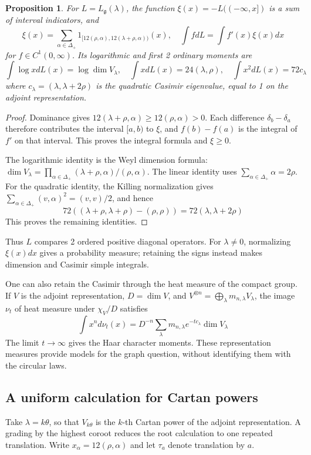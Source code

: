 \documentclass[11pt,reqno]{amsart}
\newtheorem{prop}[thm]{Proposition}
\theoremstyle{definition}
\numberwithin{equation}{section}
\begin{document}
\begin{prop}\label{prop:shift}
For $L=L_{\mathfrak g}(\lambda)$, the function $\xi(x)=-L((-\infty,x])$ is a sum of interval indicators, and
$$\xi(x)=\sum_{\alpha\in\Delta_+}1_{[12(\rho,\alpha),12(\lambda+\rho,\alpha))}(x),\quad \int fdL=\int f'(x)\xi(x)dx$$
for $f\in C^1(0,\infty)$. Its logarithmic and first 2 ordinary moments are
$$\int\log xdL(x)=\log\dim V_\lambda,\quad \int xdL(x)=24(\lambda,\rho),\quad \int x^2dL(x)=72c_\lambda$$
where $c_\lambda=(\lambda,\lambda+2\rho)$ is the quadratic Casimir eigenvalue, equal to 1 on the adjoint representation.
\end{prop}
\begin{proof}
Dominance gives $12(\lambda+\rho,\alpha)\geq12(\rho,\alpha)>0$. Each difference $\delta_b-\delta_a$ therefore contributes the interval $[a,b)$ to $\xi$, and $f(b)-f(a)$ is the integral of $f'$ on that interval. This proves the integral formula and $\xi\geq0$.

The logarithmic identity is the Weyl dimension formula: $\dim V_\lambda=\prod_{\alpha\in\Delta_+}(\lambda+\rho,\alpha)/(\rho,\alpha)$. The linear identity uses $\sum_{\alpha\in\Delta_+}\alpha=2\rho$. For the quadratic identity, the Killing normalization gives $\sum_{\alpha\in\Delta_+}(v,\alpha)^2=(v,v)/2$, and hence
$$72((\lambda+\rho,\lambda+\rho)-(\rho,\rho))=72(\lambda,\lambda+2\rho)$$
This proves the remaining identities.
\end{proof}

Thus $L$ compares 2 ordered positive diagonal operators. For $\lambda\neq0$, normalizing $\xi(x)dx$ gives a probability measure; retaining the signs instead makes dimension and Casimir simple integrals.

One can also retain the Casimir through the heat measure of the compact group. If $V$ is the adjoint representation, $D=\dim V$, and $V^{\otimes n}=\bigoplus_\lambda m_{n,\lambda}V_\lambda$, the image $\nu_t$ of heat measure under $\chi_V/D$ satisfies
$$\int x^nd\nu_t(x)=D^{-n}\sum_\lambda m_{n,\lambda}e^{-tc_\lambda}\dim V_\lambda$$
The limit $t\to\infty$ gives the Haar character moments. These representation measures provide models for the graph question, without identifying them with the circular laws.

\subsection{A uniform calculation for Cartan powers}

Take $\lambda=k\theta$, so that $V_{k\theta}$ is the $k$-th Cartan power of the adjoint representation. A grading by the highest coroot reduces the root calculation to one repeated translation. Write $x_\alpha=12(\rho,\alpha)$ and let $\tau_a$ denote translation by $a$.
\end{document}
